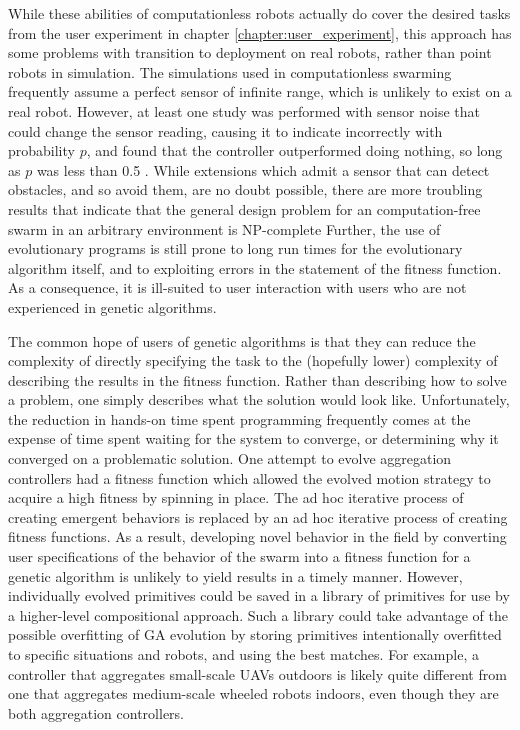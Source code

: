 While these abilities of computationless robots actually do cover the desired tasks from the user experiment in chapter \ref{chapter:user_experiment}, this approach has some problems with transition to deployment on real robots, rather than point robots in simulation. 
The simulations used in computationless swarming frequently assume a perfect sensor of infinite range, which is unlikely to exist on a real robot.
However, at least one study was performed with sensor noise that could change the sensor reading, causing it to indicate incorrectly with probability $p$, and found that the controller outperformed doing nothing, so long as $p$ was less than 0.5 \citep{gauci2014self}. 
While extensions which admit a sensor that can detect obstacles, and so avoid them, are no doubt possible, there are more troubling results that indicate that the general design problem for an computation-free swarm in an arbitrary environment is NP-complete \citep{wareham2018viable}
Further, the use of evolutionary programs is still prone to long run times for the evolutionary algorithm itself, and to exploiting errors in the statement of the fitness function. 
As a consequence, it is ill-suited to user interaction with users who are not experienced in genetic algorithms. 

The common hope of users of genetic algorithms is that they can reduce the complexity of directly specifying the task to the (hopefully lower) complexity of describing the results in the fitness function.
Rather than describing how to solve a problem, one simply describes what the solution would look like. 
Unfortunately, the reduction in hands-on time spent programming frequently comes at the expense of time spent waiting for the system to converge, or determining why it converged on a problematic solution. 
One attempt to evolve aggregation controllers had a fitness function which allowed the evolved motion strategy to acquire a high fitness by spinning in place.
The ad hoc iterative process of creating emergent behaviors is replaced by an ad hoc iterative process of creating fitness functions.
As a result, developing novel behavior in the field by converting user specifications of the behavior of the swarm into a fitness function for a genetic algorithm is unlikely to yield results in a timely manner. 
However, individually evolved primitives could be saved in a library of primitives for use by a higher-level compositional approach. 
Such a library could take advantage of the possible overfitting of GA evolution by storing primitives intentionally overfitted to specific situations and robots, and using the best matches. 
For example, a controller that aggregates small-scale UAVs outdoors is likely quite different from one that aggregates medium-scale wheeled robots indoors, even though they are both aggregation controllers. 

